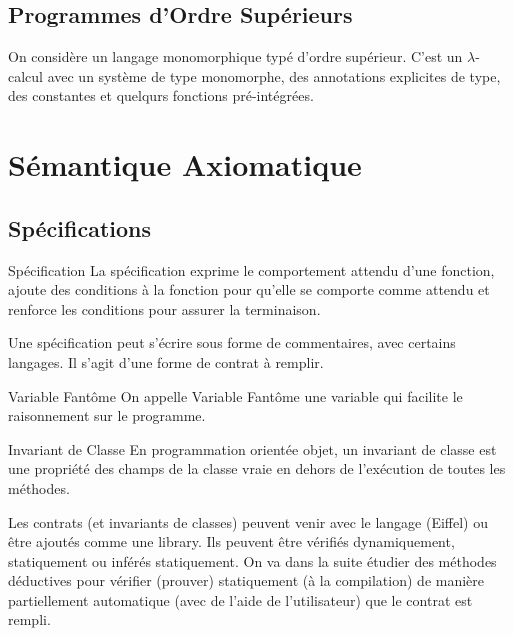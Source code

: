 \documentclass{cours}
\begin{document}
\subsection{Programmes d'Ordre Supérieurs}
On considère un langage monomorphique typé d'ordre supérieur. C'est un $\lambda$-calcul avec un système de type monomorphe, des annotations explicites de type, des constantes et quelqurs fonctions pré-intégrées.\\



\section{Sémantique Axiomatique}
\subsection{Spécifications}
\begin{définition}{Spécification}{}
La spécification exprime le comportement attendu d'une fonction, ajoute des conditions à la fonction pour qu'elle se comporte comme attendu et renforce les conditions pour assurer la terminaison.
\end{définition}

Une spécification peut s'écrire sous forme de commentaires, avec certains langages. Il s'agit d'une forme de contrat à remplir.

\begin{définition}{Variable Fantôme}{}
On appelle Variable Fantôme une variable qui facilite le raisonnement sur le programme.
\end{définition}

\begin{définition}
{Invariant de Classe}{}
En programmation orientée objet, un invariant de classe est une propriété des champs de la classe vraie en dehors de l'exécution de toutes les méthodes.
\end{définition}

Les contrats (et invariants de classes) peuvent venir avec le langage (Eiffel) ou être ajoutés comme une library.
Ils peuvent être vérifiés dynamiquement, statiquement ou inférés statiquement.
On va dans la suite étudier des méthodes déductives pour vérifier (prouver) statiquement (à la compilation) de manière partiellement automatique (avec de l'aide de l'utilisateur) que le contrat est rempli.
\end{document}
